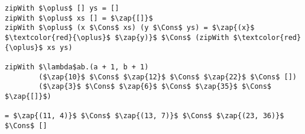 \begin{frame}[fragile]


\begin{lstlisting}[mathescape=true,numbers=none]
zipWith $\oplus$ [] ys = []
zipWith $\oplus$ xs [] = $\zap{[]}$
zipWith $\oplus$ (x $\Cons$ xs) (y $\Cons$ ys) = $\zap{(x}$ $\textcolor{red}{\oplus}$ $\zap{y)}$ $\Cons$ (zipWith $\textcolor{red}{\oplus}$ xs ys)

zipWith $\lambda$ab.(a + 1, b + 1)
        ($\zap{10}$ $\Cons$ $\zap{12}$ $\Cons$ $\zap{22}$ $\Cons$ [])
        ($\zap{3}$ $\Cons$ $\zap{6}$ $\Cons$ $\zap{35}$ $\Cons$ $\zap{[]}$)

= $\zap{(11, 4)}$ $\Cons$ $\zap{(13, 7)}$ $\Cons$ $\zap{(23, 36)}$ $\Cons$ []
\end{lstlisting}

\end{frame}
